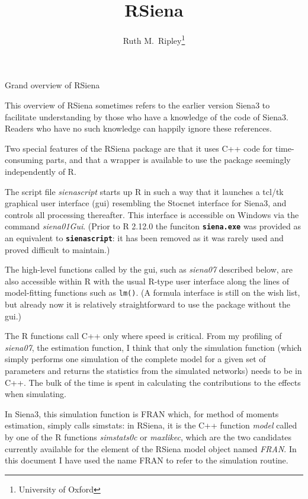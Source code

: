 \documentclass[12pt,a4paper]{article}
\makeatletter
\renewcommand{\=}{\,=\,}
\newcommand{\+}{\,+\,}
\newcommand{\nm}[1]{\textsf{ #1}}
\newcommand{\nnm}[1]{\textsf{\textit{#1}}}
\renewcommand{\section}{\@startsection{section}{1}
                {0pt}{\baselineskip}{0.5\baselineskip}
                {\centering\sffamily} }
\newcommand{\sfn}[1]{\textbf{\texttt{#1}}}
\newcommand{\R}{{\sf R }}
\newcommand{\Rn}{{\sf R}}
\newcommand{\rs}{{\sf RSiena}}
\newcommand{\RS}{{\sf RSiena }}
\newcommand{\SI}{{\sf Siena3 }}
\newcommand{\Sn}{{\sf Siena3}}
\makeatother
\begin{document}

\title{RSiena}
\author{Ruth M.\ Ripley\footnote{University of Oxford}}
\maketitle
\date{}


\section{Grand overview of  RSiena}

This overview of \RS sometimes refers to the earlier version \SI to
facilitate understanding by those who have a knowledge
of the code of \Sn. Readers who have no such knowledge
can happily ignore these references.

Two special features of the \RS package are that it uses C++ code for
time-consuming parts, and that a wrapper is available to use the package
seemingly independently of \Rn.

The script file \nnm{sienascript} starts up \R in such a way that it launches a
tcl/tk graphical user interface (gui) resembling the Stocnet interface for \Sn,
and controls all processing thereafter. This interface is accessible on Windows
via the command \nnm{siena01Gui}. (Prior to R 2.12.0 the funciton
\sfn{siena.exe} was provided as an equivalent to \sfn{sienascript}: it has been
removed as it was rarely used and proved difficult to maintain.)

The high-level functions called by the gui, such as \nnm{siena07} described
below, are also accessible within \R with the usual \Rn-type user interface
along the lines of model-fitting functions such as \verb|lm()|. (A formula
interface is still on the wish list, but already now it is relatively
straightforward to use the package without the gui.)

The \R functions call C++ only where speed is critical. From my profiling of
\nnm{siena07}, the estimation function, I think that only the simulation
function (which simply performs one simulation of the complete model for a given
set of parameters and returns the statistics from the simulated networks) needs
to be in C++. The bulk of the time is spent in calculating the contributions to
the effects when simulating.

In \Sn, this simulation function is \nm{FRAN} which, for method of moments
estimation, simply calls \nm{simstats}: in \rs, it is the C++ function
\nnm{model} called by one of the \R functions \nnm{simstats0c} or
\nnm{maxlikec}, which are the two candidates currently available for the element
of the \RS model object named \nnm{FRAN}. In this document I have used the name
\nm{FRAN} to refer to the simulation routine.
\end{document}
